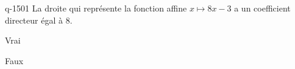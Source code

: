 \begin{truefalse}{q-1501}
La droite qui représente la fonction affine $x\mapsto 8x-3$ a un coefficient directeur égal à $8$.
\item* Vrai
\item Faux
\end{truefalse}

